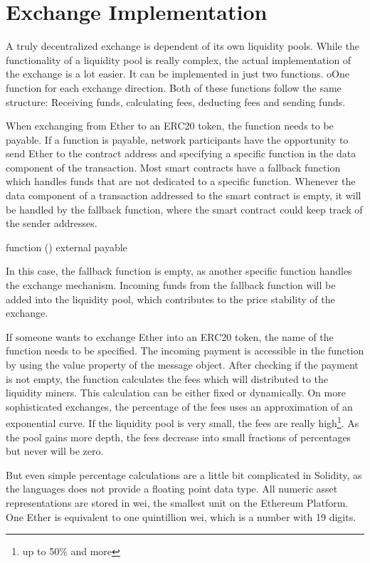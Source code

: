 \section{Exchange Implementation}
A truly decentralized exchange is dependent of its own liquidity pools. While the functionality of a liquidity pool is really complex, the actual implementation of the exchange is a lot easier. It can be implemented in just two functions. oOne function for each exchange direction. Both of these functions follow the same structure: Receiving funds, calculating fees, deducting fees and sending funds.

When exchanging from Ether to an ERC20 token, the function needs to be payable. If a function is payable, network participants have the opportunity to send Ether to the contract address and specifying a specific function in the data component of the transaction. Most smart contracts have a fallback function which handles funds that are not dedicated to a specific function. Whenever the data component of a transaction addressed to the smart contract is empty, it will be handled by the fallback function, where the smart contract could keep track of the sender addresses.
 
\begin{GenericCode}
function () external payable {} 
\end{GenericCode}

In this case, the fallback function is empty, as another specific function handles the exchange mechanism. Incoming funds from the fallback function will be added into the liquidity pool, which contributes to the price stability of the exchange.

If someone wants to exchange Ether into an ERC20 token, the name of the function needs to be specified. The incoming payment is accessible in the function by using the value property of the message object. After checking if the payment is not empty, the function calculates the fees which will distributed to the liquidity miners. This calculation can be either fixed or dynamically. On more sophisticated exchanges, the percentage of the fees uses an approximation of an exponential curve. If the liquidity pool is very small, the fees are really high\footnote{up to 50\% and more}. As the pool gains more depth, the fees decrease into small fractions of percentages but never will be zero.

But even simple percentage calculations are a little bit complicated in Solidity, as the languages does not provide a floating point data type. All numeric asset representations are stored in wei, the smallest unit on the Ethereum Platform. One Ether is equivalent to one quintillion wei, which is a number with 19 digits.


